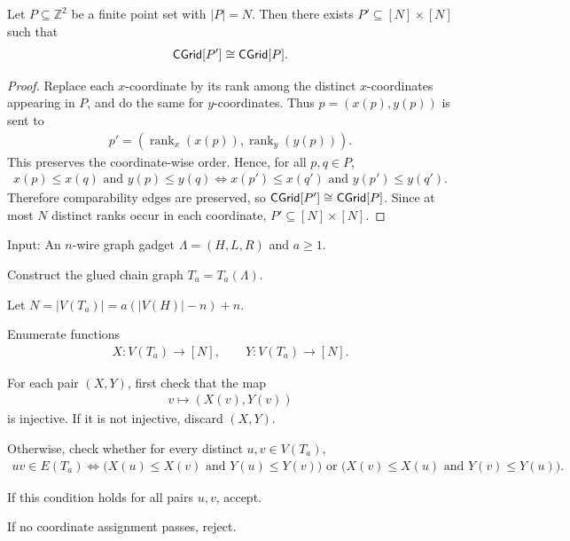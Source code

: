\begin{lemma}
\label{lem:rank-compression-cgrid}
Let \(P\subseteq \mathbb Z^2\) be a finite point set with \(|P|=N\). Then
there exists \(P'\subseteq [N]\times[N]\) such that
\begin{align}
    \mathsf{CGrid}[P']\cong \mathsf{CGrid}[P].
\end{align}
\end{lemma}

\begin{proof}
Replace each \(x\)-coordinate by its rank among the distinct \(x\)-coordinates
appearing in \(P\), and do the same for \(y\)-coordinates. Thus
\(p=(x(p),y(p))\) is sent to
\begin{align}
    p'
    =
    (\operatorname{rank}_x(x(p)),\operatorname{rank}_y(y(p))).
\end{align}
This preserves the coordinate-wise order. Hence, for all \(p,q\in P\),
\begin{align}
    x(p)\leq x(q)\text{ and }y(p)\leq y(q)
    \iff
    x(p')\leq x(q')\text{ and }y(p')\leq y(q').
\end{align}
Therefore comparability edges are preserved, so
\(\mathsf{CGrid}[P']\cong \mathsf{CGrid}[P]\). Since at most \(N\) distinct ranks occur in
each coordinate, \(P'\subseteq [N]\times[N]\).
\end{proof}

\begin{algorithm}[H]
\caption{Finite test for \(a\)-tileability}
\label{alg:a-tileability-test}
Input: An \(n\)-wire graph gadget \(\Lambda=(H,L,R)\) and \(a\geq 1\).

Construct the glued chain graph \(T_a=T_a(\Lambda)\).

Let \(N=|V(T_a)|=a(|V(H)|-n)+n\).

Enumerate functions
\begin{align}
    X:V(T_a)\to[N],
    \qquad
    Y:V(T_a)\to[N].
\end{align}

For each pair \((X,Y)\), first check that the map
\begin{align}
    v\mapsto (X(v),Y(v))
\end{align}
is injective. If it is not injective, discard \((X,Y)\).

Otherwise, check whether for every distinct \(u,v\in V(T_a)\),
\begin{align}
    uv\in E(T_a)
    \iff
    \bigl(X(u)\leq X(v)\text{ and }Y(u)\leq Y(v)\bigr)
    \text{ or }
    \bigl(X(v)\leq X(u)\text{ and }Y(v)\leq Y(u)\bigr).
\end{align}

If this condition holds for all pairs \(u,v\), accept.

If no coordinate assignment passes, reject.
\end{algorithm}

